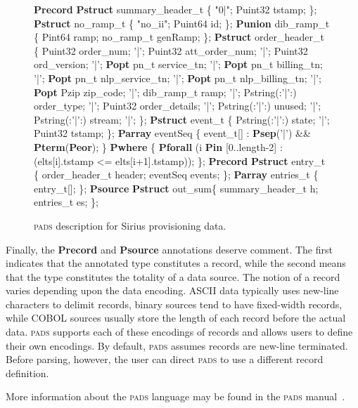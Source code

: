 \documentclass{sigplanconf}
\newcommand{\dibbler}{Sirius}
\newcommand{\bftt}[1]{{\ttfamily\bfseries{#1}}}
\newcommand{\kw}[1]{\bftt{#1}}
\newcommand{\pads}{\textsc{pads}}
\begin{document}
\begin{figure}
\begin{code}
\kw{Precord} \kw{Pstruct} summary\_header\_t \{
  "0|";
  Puint32       tstamp;
\};
\mbox{}
\kw{Pstruct} no\_ramp\_t \{
  "no\_ii";
  Puint64 id;
\};
\mbox{}
\kw{Punion} dib\_ramp\_t \{
  Pint64     ramp;
  no\_ramp\_t  genRamp;
\};
\mbox{}
\kw{Pstruct} order\_header\_t \{
       Puint32             order\_num;
 '|';  Puint32             att\_order\_num;
 '|';  Puint32             ord\_version;
 '|';  \kw{Popt} pn\_t           service\_tn;
 '|';  \kw{Popt} pn\_t           billing\_tn;
 '|';  \kw{Popt} pn\_t           nlp\_service\_tn;
 '|';  \kw{Popt} pn\_t           nlp\_billing\_tn;
 '|';  \kw{Popt} Pzip           zip\_code;
 '|';  dib\_ramp\_t          ramp;
 '|';  Pstring(:'|':)      order\_type;
 '|';  Puint32             order\_details;
 '|';  Pstring(:'|':)      unused;
 '|';  Pstring(:'|':)      stream;
 '|';
\};
\mbox{}
\kw{Pstruct} event\_t \{
  Pstring(:'|':) state;   '|';
  Puint32        tstamp;
\};
\mbox{}
\kw{Parray} eventSeq \{
  event\_t[] : \kw{Psep}('|') && \kw{Pterm}(\kw{Peor});
\} \kw{Pwhere} \{
  \kw{Pforall} (i \kw{Pin} [0..length-2] :
           (elts[i].tstamp <= elts[i+1].tstamp));
\};
\mbox{}
\kw{Precord} \kw{Pstruct} entry\_t \{
  order\_header\_t  header;
  eventSeq        events;
\};
\mbox{}
\kw{Parray} entries\_t \{
  entry\_t[];
\};
\mbox{}
\kw{Psource} \kw{Pstruct} out\_sum\{
  summary\_header\_t  h;
  entries\_t         es;
\};
\end{code}
\caption{\pads{} description for \dibbler{} provisioning data.}
\label{figure:dibbler}
\end{figure}


Finally, the \kw{Precord} and \kw{Psource} annotations deserve comment.  The first
indicates that the annotated type constitutes a record,
while the second means that the type constitutes the totality of a data source.  
The notion of a record varies depending upon the data encoding.  
ASCII data typically uses new-line characters to delimit 
records, binary sources tend to have fixed-width records, while 
COBOL sources usually store the length of each record before the actual data.
\pads{} supports each of these encodings of records and allows users to define
their own encodings.  By default, \pads{} assumes records are new-line terminated.
Before parsing, however, the user can direct \pads{} to use a different record
definition.

More information about the \pads{} language may be found in the
\pads{} manual~\cite{padsmanual}.
\end{document}
